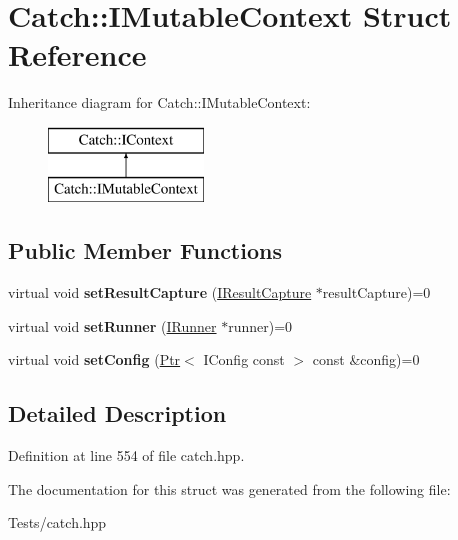 \hypertarget{struct_catch_1_1_i_mutable_context}{}\section{Catch\+:\+:I\+Mutable\+Context Struct Reference}
\label{struct_catch_1_1_i_mutable_context}
Inheritance diagram for Catch\+:\+:I\+Mutable\+Context\+:\begin{figure}[H]
\begin{center}
\leavevmode
\includegraphics[height=2.000000cm]{struct_catch_1_1_i_mutable_context}
\end{center}
\end{figure}
\subsection*{Public Member Functions}
\begin{DoxyCompactItemize}
\item 
\mbox{\label{struct_catch_1_1_i_mutable_context_a4a80afd0525b7def21bee8d9b48f2d39}} 
virtual void {\bfseries set\+Result\+Capture} (\hyperlink{struct_catch_1_1_i_result_capture}{I\+Result\+Capture} $\ast$result\+Capture)=0
\item 
\mbox{\label{struct_catch_1_1_i_mutable_context_af2e53b1dea4527a2587cff266a730f6e}} 
virtual void {\bfseries set\+Runner} (\hyperlink{struct_catch_1_1_i_runner}{I\+Runner} $\ast$runner)=0
\item 
\mbox{\label{struct_catch_1_1_i_mutable_context_a013e8f688a8ea7970262d07ead542a63}} 
virtual void {\bfseries set\+Config} (\hyperlink{class_catch_1_1_ptr}{Ptr}$<$ I\+Config const $>$ const \&config)=0
\end{DoxyCompactItemize}


\subsection{Detailed Description}


Definition at line 554 of file catch.\+hpp.



The documentation for this struct was generated from the following file\+:\begin{DoxyCompactItemize}
\item 
Tests/catch.\+hpp\end{DoxyCompactItemize}
